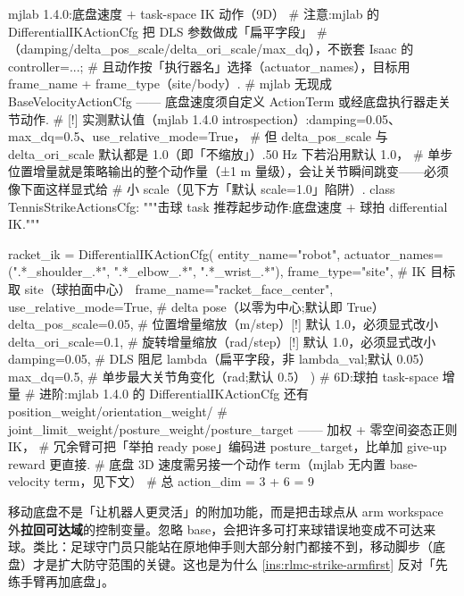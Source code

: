 \begin{codebox}[Python]{mjlab 1.4.0:底盘速度 $+$ task-space IK 动作（9D）}
# 注意:mjlab 的 DifferentialIKActionCfg 把 DLS 参数做成「扁平字段」
# （damping/delta_pos_scale/delta_ori_scale/max_dq），不嵌套 Isaac 的 controller=...;
# 且动作按「执行器名」选择（actuator_names），目标用 frame_name + frame_type（site/body）.
# mjlab 无现成 BaseVelocityActionCfg —— 底盘速度须自定义 ActionTerm 或经底盘执行器走关节动作.
# [!] 实测默认值（mjlab 1.4.0 introspection）:damping=0.05、max_dq=0.5、use_relative_mode=True，
#   但 delta_pos_scale 与 delta_ori_scale 默认都是 1.0（即「不缩放」）.50 Hz 下若沿用默认 1.0，
#   单步位置增量就是策略输出的整个动作量（±1 m 量级），会让关节瞬间跳变——必须像下面这样显式给
#   小 scale（见下方「默认 scale=1.0」陷阱）.
class TennisStrikeActionsCfg:
    """击球 task 推荐起步动作:底盘速度 + 球拍 differential IK."""

    racket_ik = DifferentialIKActionCfg(
        entity_name="robot",
        actuator_names=(".*_shoulder_.*", ".*_elbow_.*", ".*_wrist_.*"),
        frame_type="site",                     # IK 目标取 site（球拍面中心）
        frame_name="racket_face_center",
        use_relative_mode=True,                # delta pose（以零为中心;默认即 True）
        delta_pos_scale=0.05,                  # 位置增量缩放（m/step）[!] 默认 1.0，必须显式改小
        delta_ori_scale=0.1,                   # 旋转增量缩放（rad/step）[!] 默认 1.0，必须显式改小
        damping=0.05,                          # DLS 阻尼 lambda（扁平字段，非 lambda_val;默认 0.05）
        max_dq=0.5,                            # 单步最大关节角变化（rad;默认 0.5）
    )                                          # 6D:球拍 task-space 增量
    # 进阶:mjlab 1.4.0 的 DifferentialIKActionCfg 还有 position_weight/orientation_weight/
    #   joint_limit_weight/posture_weight/posture_target —— 加权 + 零空间姿态正则 IK，
    #   冗余臂可把「举拍 ready pose」编码进 posture_target，比单加 give-up reward 更直接.
    # 底盘 3D 速度需另接一个动作 term（mjlab 无内置 base-velocity term，见下文）
    # 总 action_dim = 3 + 6 = 9
\end{codebox}

\begin{insight}[移动底盘是把击球点拉回可达域的控制变量]\label{ins:rlmc-strike-base}
移动底盘不是「让机器人更灵活」的附加功能，而是把击球点从 arm workspace 外\textbf{拉回可达域}的控制变量。忽略 base，会把许多可打来球错误地变成不可达来球。类比：足球守门员只能站在原地伸手则大部分射门都接不到，移动脚步（底盘）才是扩大防守范围的关键。这也是为什么 \cref{ins:rlmc-strike-armfirst} 反对「先练手臂再加底盘」。
\end{insight}

